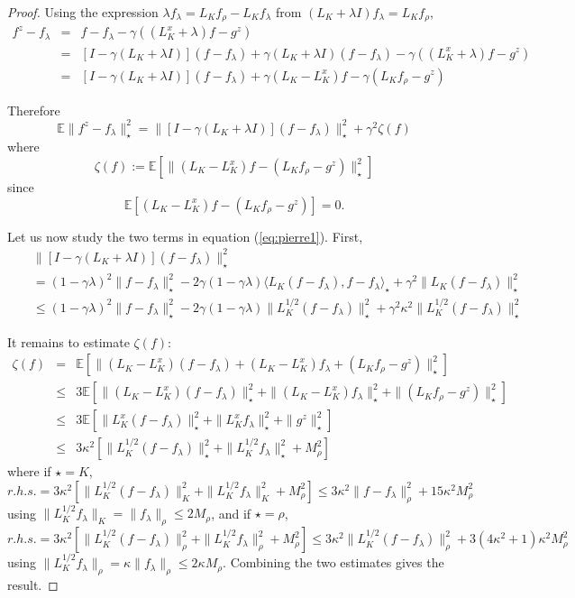 \documentclass[twoside,11pt]{amsart}
\theoremstyle{theorem}
\theoremstyle{definition}
\theoremstyle{remark}
\def\<{{\langle}}
\def\>{{\rangle}}
\def\E{{\mathbb E}}        %
\def\M{M_\rho}
\def\la{\lambda}
\def\ka{\kappa}
\def\ga{\gamma}
\def\ze{\zeta}
\def\st{\star}
\begin{document}
\begin{proof}
Using the expression $\la f_\la = L_K f_\rho - L_K f_\la$ from $(L_K + \la I ) f_\la = L_K f_\rho$, 
\begin{eqnarray*}
f^z-f_\la & = & f - f_\la -\ga ((L_K^x + \la) f - g^z) \\
& = & [ I - \ga (L_K + \la I) ](f-f_\la) + \ga(L_K +\la I) (f - f_\la) - \ga ((L_K^x + \la) f - g^z) \\
& = & [ I - \ga (L_K + \la I) ](f-f_\la) + \ga(L_K -L_K^x) f  - \ga (L_K f_\rho - g^z)
\end{eqnarray*}

Therefore
\begin{equation}  \label{eq:pierre1}
\E\|f^z - f_\la\|_\st^2 = \|[ I - \ga (L_K + \la I) ](f-f_\la)\|_\st^2 + \ga^2 \zeta(f) 
\end{equation}
where
\[ \zeta(f):= \E[\|(L_K-L_K^x)f - (L_K f_\rho - g^z)\|_\st^2] \]
since
\[ \E[(L_K-L_K^x)f - (L_K f_\rho - g^z)]=0. \]

Let us now study the two terms in equation (\ref{eq:pierre1}). First,
\begin{eqnarray*}
& & \|[ I - \ga (L_K + \la I) ](f-f_\la)\|_\st^2  \\
& & = (1-\ga \la)^2 \|f-f_\la\|_\st^2 -2 \ga (1-\ga\la) \<L_K (f-f_\la),f-f_\la\>_\st + \ga^2 \|L_K (f-f_\la)\|_\st^2 \\
& & \leq   (1-\ga \la)^2 \|f-f_\la\|_\st^2 - 2 \ga (1-\ga\la) \|L_K^{1/2} (f-f_\la)\|_\st^2 + \ga^2 \ka^2 \|L_K^{1/2} ( f-f_\la)\|_\st^2 
\end{eqnarray*} 

It remains to estimate $\ze(f)$:
\begin{eqnarray*}
\ze(f) & =  & \E [ \|(L_K-L_K^x)(f -f_\la)+ (L_K - L_K^x)f_\la+ (L_K f_\rho - g^z)\|_\st^2 ] \\
& \leq & 3 \E[\|(L_K-L_K^x)(f -f_\la)\|_\st^2+ \|(L_K - L_K^x)f_\la\|_\st^2+ \|(L_K f_\rho - g^z)\|_\st^2] \\
& \leq & 3 \E [\|L_K^x(f-f_\la)\|_\st^2 + \|L_K^x f_\la \|_\st^2 + \|g^z\|_\st^2 ] \\
& \leq & 3 \kappa^2 [\|L_K^{1/2}(f-f_\la)\|_\st^2 + \|L_K^{1/2} f_\la \|_\st^2 + \M^2]  
\end{eqnarray*}
where if $\st=K$, 
\[ r.h.s. = 3 \kappa^2 [\|L_K^{1/2}(f-f_\la)\|_K^2 + \|L_K^{1/2} f_\la \|_K^2 + \M^2] \leq 3 \kappa^2 \|f-f_\la\|_\rho^2  + 15 \ka^2 \M^2 \]
using $\|L_K^{1/2} f_\la\|_K = \|f_\la\|_\rho\leq 2 \M$, and if $\st=\rho$,
\[ r.h.s. = 3 \kappa^2 [\|L_K^{1/2}(f-f_\la)\|_\rho^2 + \|L_K^{1/2} f_\la \|_\rho^2 + \M^2] \leq 3 \kappa^2 \|L_K^{1/2}(f-f_\la)\|_\rho^2  + 3 (4\ka^2+1) \ka^2 \M^2 \]
using $\|L_K^{1/2} f_\la\|_\rho = \ka \|f_\la\|_\rho\leq 2 \ka \M$. Combining the two estimates gives the result. 
\end{proof}
\end{document}

